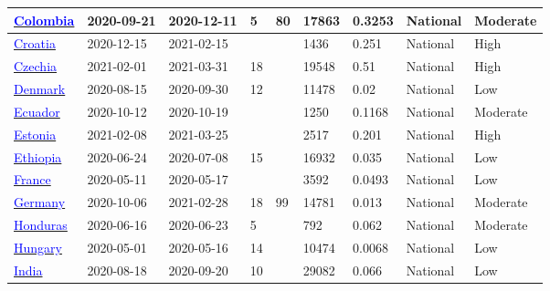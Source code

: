 \begin{table}[ht]
\begin{center}
\begin{tabular}{p{2cm} | p{1.6cm} | p{1.6cm} | p{0.8cm} | p{0.8cm} | p{1cm} | p{1.3cm} | p{1.2cm} | p{1.2cm}}
           \hline 
           \href{https://dx.doi.org/10.1016/j.lana.2022.100195}{\textcolor{blue}{Colombia}} & 2020-09-21 & 2020-12-11 & 5 & 80 & 17863 & 0.3253 & National & Moderate \\ 
           \hline 
           \href{https://dx.doi.org/10.3390/pathogens10060774}{\textcolor{blue}{Croatia}} & 2020-12-15 & 2021-02-15 &  &  & 1436 & 0.251 & National & High \\ 
           \hline 
           \href{https://doi.org/10.1038/s43856-022-00080-0}{\textcolor{blue}{Czechia}} & 2021-02-01 & 2021-03-31 & 18 &  & 19548 & 0.51 & National & High \\ 
           \hline 
           \href{https://dx.doi.org/10.1007/s10654-021-00796-8}{\textcolor{blue}{Denmark}} & 2020-08-15 & 2020-09-30 & 12 &  & 11478 & 0.02 & National & Low \\ 
           \hline 
           \href{https://dx.doi.org/10.3389/fmed.2022.933260}{\textcolor{blue}{Ecuador}} & 2020-10-12 & 2020-10-19 &  &  & 1250 & 0.1168 & National & Moderate \\ 
           \hline 
           \href{https://dx.doi.org/10.1080/23744235.2021.1974540}{\textcolor{blue}{Estonia}} & 2021-02-08 & 2021-03-25 &  &  & 2517 & 0.201 & National & High \\ 
           \hline 
           \href{http://dx.doi.org/10.1016/j.ijid.2021.08.028}{\textcolor{blue}{Ethiopia}} & 2020-06-24 & 2020-07-08 & 15 &  & 16932 & 0.035 & National & Low \\ 
           \hline 
           \href{https://dx.doi.org/10.1038/s41467-021-23233-6}{\textcolor{blue}{France}} & 2020-05-11 & 2020-05-17 &  &  & 3592 & 0.0493 & National & Low \\ 
           \hline 
           \href{https://dx.doi.org/10.1038/s41598-022-23821-6}{\textcolor{blue}{Germany}} & 2020-10-06 & 2021-02-28 & 18 & 99 & 14781 & 0.013 & National & Moderate \\ 
           \hline 
           \href{https://revistas.ucr.ac.cr/index.php/psm/article/view/43261/46175}{\textcolor{blue}{Honduras}} & 2020-06-16 & 2020-06-23 & 5 &  & 792 & 0.062 & National & Moderate \\ 
           \hline 
           \href{https://dx.doi.org/10.1007/s11357-020-00226-9}{\textcolor{blue}{Hungary}} & 2020-05-01 & 2020-05-16 & 14 &  & 10474 & 0.0068 & National & Low \\ 
           \hline 
           \href{https://dx.doi.org/10.1016/S2214-109X(20)30544-1}{\textcolor{blue}{India}} & 2020-08-18 & 2020-09-20 & 10 &  & 29082 & 0.066 & National & Low \\ 

\end{tabular}
\end{center}
\end{table}
